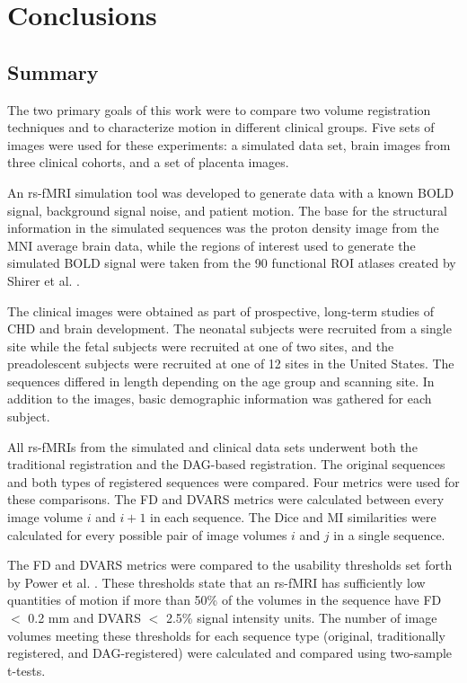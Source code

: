 \chapter{Conclusions}
\label{ch:fin}

\section{Summary}

The two primary goals of this work were to compare two volume registration techniques and to characterize motion in different clinical groups. Five sets of images were used for these experiments: a simulated data set, brain images from three clinical cohorts, and a set of placenta images. 

An rs-fMRI simulation tool was developed to generate data with a known BOLD signal, background signal noise, and patient motion. The base for the structural information in the simulated sequences was the proton density image from the MNI average brain data, while the regions of interest used to generate the simulated BOLD signal were taken from the 90 functional ROI atlases created by Shirer et al. \cite{Shirer2012}. 

The clinical images were obtained as part of prospective, long-term studies of CHD and brain development. The neonatal subjects were recruited from a single site while the fetal subjects were recruited at one of two sites, and the preadolescent subjects were recruited at one of 12 sites in the United States. The sequences differed in length depending on the age group and scanning site. In addition to the images, basic demographic information was gathered for each subject.

All rs-fMRIs from the simulated and clinical data sets underwent both the traditional registration and the DAG-based registration. The original sequences and both types of registered sequences were compared. Four metrics were used for these comparisons. The FD and DVARS metrics were calculated between every image volume $i$ and $i+1$ in each sequence. The Dice and MI similarities were calculated for every possible pair of image volumes $i$ and $j$ in a single sequence. 

The FD and DVARS metrics were compared to the usability thresholds set forth by Power et al. \cite{Power2012}. These thresholds state that an rs-fMRI has sufficiently low quantities of motion if more than 50\% of the volumes in the sequence have FD $<$ 0.2 mm and DVARS $<$ 2.5\% signal intensity units. The number of image volumes meeting these thresholds for each sequence type (original, traditionally registered, and DAG-registered) were calculated and compared using two-sample t-tests. 

